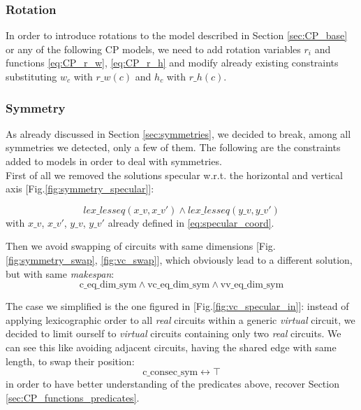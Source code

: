 
\subsubsection{Rotation}

In order to introduce rotations to the model described in Section \ref{sec:CP_base} or any 
of the following CP models, we need to add rotation variables $r_i$ and functions \ref{eq:CP_r_w}, \ref{eq:CP_r_h} 
and modify already existing constraints substituting $w_c$ with $r\_w(c)$ and $h_c$ with $r\_h(c)$.

\subsubsection{Symmetry}

As already discussed in Section \ref{sec:symmetries}, we decided to break, among all symmetries we
detected, only a few of them. The following are the constraints added to models in order to
deal with symmetries.\\

First of all we removed the solutions specular w.r.t. the horizontal and vertical axis [Fig.\ref{fig:symmetry_specular}]:

\begin{equation*}
  lex\_lesseq(x\_v, x\_v') \land lex\_lesseq(y\_v, y\_v')
\end{equation*}
with $x\_v$, $x\_v'$, $y\_v$, $y\_v'$ already defined in \ref{eq:specular_coord}.

Then we avoid swapping of circuits with same dimensions [Fig.\ref{fig:symmetry_swap}, \ref{fig:vc_swap}],
which obviously lead to a different solution, but with same \textit{makespan}:
\begin{equation*}
  \text{c\_eq\_dim\_sym} \land \text{vc\_eq\_dim\_sym} \land \text{vv\_eq\_dim\_sym}
\end{equation*}

The case we simplified is the one figured in [Fig.\ref{fig:vc_specular_in}]: instead of applying
lexicographic order to all \textit{real} circuits within a generic \textit{virtual} circuit, we
decided to limit ourself to \textit{virtual} circuits containing only two \textit{real} circuits.
We can see this like avoiding adjacent circuits, having the shared edge with same length,
to swap their position:
\begin{equation*}
  \text{c\_consec\_sym} \leftrightarrow \top
\end{equation*}
in order to have better understanding of the predicates above, recover Section \ref{sec:CP_functions_predicates}.

